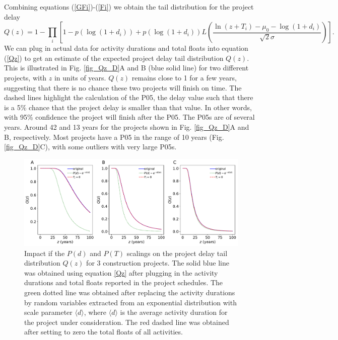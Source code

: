 \documentclass[11pt]{article}
\begin{document}
Combining equations (\ref{GFi})-(\ref{Fi}) we obtain the tail distribution for the project delay
%
\begin{equation}
Q(z) = 1 - \prod_i \left[ 1-p(\log(1+d_i)) +
 p(\log(1+d_i)) L\left(   \frac{\ln (z+T_i) - \mu_0 - \log(1+d_i )  }{ \sqrt{2}\sigma} \right) \right].
 \label{Qz}
\end{equation}
%
We can plug in actual data for activity durations and total floats into equation (\ref{Qz}) to get an estimate of the expected project delay tail distribution $Q(z)$. This is illustrated in Fig. \ref{fig_Qz_D}A and B (blue solid line) for two different projects, with $z$ in units of years. $Q(z)$ remains close to 1 for a few years, suggesting that there is no chance these two projects will finish on time. The dashed lines highlight the calculation of the P05, the delay value such that there is a 5\% chance that the project delay is smaller than that value. In other words, with 95\% confidence the project will finish after the P05. The P05s are of several years. Around 42 and 13 years for the projects shown in Fig. \ref{fig_Qz_D}A and B, respectively. Most projects have a P05 in the range of 10 years (Fig. \ref{fig_Qz_D}C), with some outliers with very large P05s.

\begin{figure}[t]
\begin{center}
\includegraphics[width=6.3in]{fig_Qz_exp}
\end{center}
\caption{Impact if the $P(d)$ and $P(T)$ scalings on the project delay tail distribution $Q(z)$ for 3 construction projects. The solid blue line was obtained using equation \ref{Qz} after plugging in the activity durations and total floats reported in the project schedules. The green dotted line was obtained after replacing the activity durations by random variables extracted from an exponential distribution with scale parameter $\langle d\rangle$, where $\langle d\rangle$ is the average activity duration for the project under consideration. The red dashed line was obtained after setting to zero the total floats of all activities.}
\label{fig_Qz_exp}
\end{figure}
\end{document}
